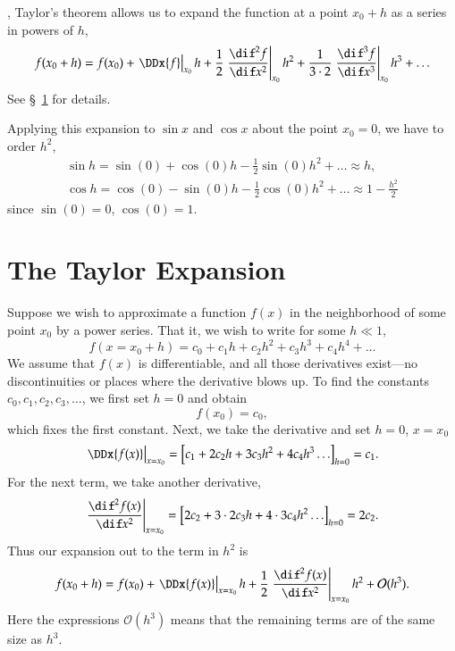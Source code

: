 , Taylor's theorem allows us to expand the function at  a point $x_{0}+h$ as a series in powers of $h$,
\[ f(x_{0}+h) = f(x_{0}) + \left.\DDx{f}\right|_{x_{0}} h + \frac{1}{2}\left.\frac{\dif^{2}f}{\dif x^{2}}\right|_{x_{0}} h^{2} + \frac{1}{3\cdot 2}\left.\frac{\dif^{3} f}{\dif x^{3}} \right|_{x_{0}} h^{3} + \ldots
\]
See \S~\ref{s.taylor-expansion} for details.

Applying this expansion to $\sin x$ and $\cos x$ about the point $x_{0} = 0$, we have to order $h^{2}$,
\begin{eqnarray}
	\sin h = \sin(0) + \cos(0)h - \frac{1}{2}\sin(0) h^{2} + \ldots 
		\approx h,\label{e.Taylor-sine}\\
	\cos h = \cos(0) - \sin(0) h - \frac{1}{2} \cos(0) h^{2} + \ldots
		\approx 1-\frac{h^{2}}{2}\label{e.Taylor-cosine}
\end{eqnarray}
since $\sin(0) = 0$, $\cos(0) = 1$.

\section{The Taylor Expansion}\label{s.taylor-expansion}
Suppose we wish to approximate a function $f(x)$ in the neighborhood of some point $x_{0}$ by a power series.  That it, we wish to write for some $h \ll 1$,
\[
 f(x = x_{0}+h) = c_{0} + c_{1} h + c_{2} h^{2} + c_{3} h^{3} + c_{4} h^{4}+ \ldots
\]
We assume that $f(x)$ is differentiable, and all those derivatives exist---no discontinuities or places where the derivative blows up.  To find the constants $c_{0}, c_{1}, c_{2}, c_{3}, \ldots$, we first set $h = 0$ and obtain
\[
	f(x_{0}) = c_{0},
\]
which fixes the first constant.  Next, we take the derivative and set $h = 0$, $x = x_{0}$
\[
\left.\DDx{f(x)}\right|_{x=x_{0}} = \left[c_{1} + 2c_{2} h + 3 c_{3}h^{2} + 4 c_{4} h^{3} \ldots\right]_{h= 0} = c_{1}.
\]
For the next term, we take another derivative,
\[
\left.\frac{\dif^{2}f(x)}{\dif x^{2}}\right|_{x=x_{0}} = \left[ 2c_{2} + 3\cdot 2 c_{3} h + 4\cdot 3 c_{4} h^{2}\ldots\right]_{h=0} = 2c_{2}.
\]
Thus our expansion out to the term in $h^{2}$ is
\[
 f(x_{0}+h) = f(x_{0}) + \left.\DDx{f(x)}\right|_{x=x_{0}} h + \frac{1}{2}\left.\frac{\dif^{2}f(x)}{\dif x^{2}}\right|_{x=x_{0}} h^{2} + \mathcal{O}(h^{3}).
\]
Here the expressions $\mathcal{O}(h^{3})$ means that the remaining terms are of the same size as $h^{3}$.

